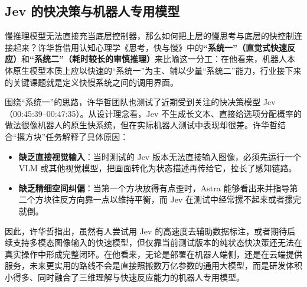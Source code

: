 \documentclass[UTF8,a4paper,11pt,fontset=fandol]{ctexart}
\begin{document}
\subsection{Jev 的快决策与机器人专用模型}
慢推理模型无法直接充当底层控制器，那么如何把上层的慢思考与底层的快控制连接起来？许华哲借用认知心理学《思考，快与慢》中的\textbf{“系统一”（直觉式快速反应）}和\textbf{“系统二”（耗时较长的审慎推理）}来比喻这一分工：在他看来，机器人本体原生模型本质上应以快速的“系统一”为主、辅以少量“系统二”能力，行业接下来的关键课题就是定义快慢系统之间的调用界面。

围绕“系统一”的思路，许华哲团队也测试了近期受到关注的快决策模型 Jev（00:45:39–00:47:35）。从设计理念看，Jev 不生成长文本、直接给选项分配概率的做法很像机器人的原生快系统，但在实际机器人测试中表现却很差。许华哲结合“摞方块”任务解释了具体原因：
\begin{itemize}
\item \textbf{缺乏直接视觉输入}：当时测试的 Jev 版本无法直接输入图像，必须先运行一个 VLM 或其他视觉模型，把画面转化为状态描述再传给它，拉长了感知链路。
\item \textbf{缺乏精细空间纠偏}：当第一个方块放得有点歪时，Astra 能够看出来并指导第二个方块往反方向靠一点以维持平衡，而 Jev 在测试中经常摞不起来或者摞完就倒。
\end{itemize}

因此，许华哲指出，虽然有人尝试用 Jev 的高速度去辅助数据标注，或者期待后续支持多模态图像输入的快速模型，但仅靠当前测试版本的纯状态快决策还无法在真实操作中形成完整闭环。在他看来，无论是部署在机器人端侧，还是在云端提供服务，未来更实用的路线不会是直接照搬数万亿参数的通用大模型，而是研发体积小得多、同时融合了三维理解与快速反应能力的机器人专用模型。
\end{document}
